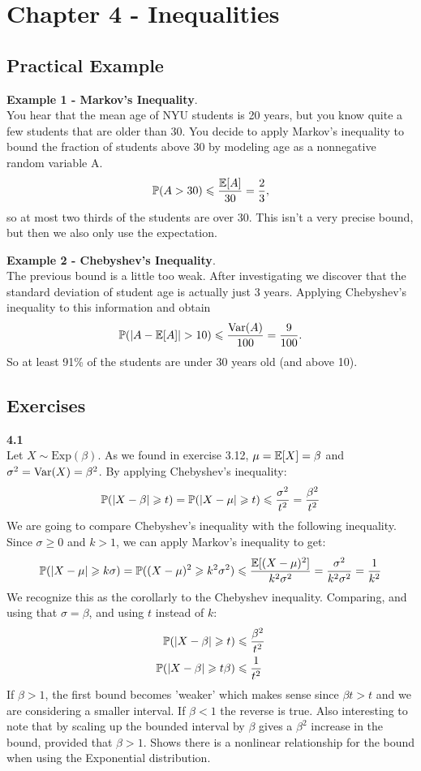 
\newpage
\section{Chapter 4 - Inequalities}

\subsection*{Practical Example}
\textbf{Example 1 - Markov's Inequality}.\\
You hear that the mean age of NYU students is 20 years, but you know quite a few
students that are older than 30. You decide to apply Markov's inequality to bound
the fraction of students above 30 by modeling age as a nonnegative random variable A.
$$
\P(A > 30) \leq \frac{\E[A]}{30} = \frac{2}{3},
$$
so at most two thirds of the students are over 30.
This isn't a very precise bound, but then we also only use the expectation.

\medskip\noindent
\textbf{Example 2 - Chebyshev's Inequality}.\\
The previous bound is a little too weak. After investigating we discover that the
standard deviation of student age is actually just 3 years. Applying Chebyshev's
inequality to this information and obtain
$$
\P(|A - \E[A]| > 10) \leq \frac{\V(A)}{100} = \frac{9}{100}.
$$
So at least 91\% of the students are under 30 years old (and above 10).

\subsection*{Exercises}
\textbf{4.1}\\  %
Let $X\sim\text{Exp}(\beta)$. As we found in exercise 3.12, $\mu = \E[X] = \beta$ and
$\sigma^2 = \V(X) = \beta^2$. By applying Chebyshev's inequality:
$$
\P(|X-\beta|\geq t) = \P(|X-\mu|\geq t) \leq \frac{\sigma^2}{t^2} = \frac{\beta^2}{t^2}
$$
We are going to compare Chebyshev's inequality with the following inequality. Since $\sigma\geq 0$
and $k > 1$, we can apply Markov's inequality to get:
$$
\P(|X-\mu|\geq k\sigma) = \P((X-\mu)^2\geq k^2\sigma^2) \leq
\frac{\E[(X-\mu)^2]}{k^2\sigma^2} = \frac{\sigma^2}{k^2\sigma^2} = \frac{1}{k^2}
$$
We recognize this as the corollarly to the Chebyshev inequality. Comparing,
and using that $\sigma = \beta$, and using $t$ instead of $k$:
\begin{align*}
    \P(|X-\beta|\geq t) &\leq \frac{\beta^2}{t^2} \\
    \P(|X-\beta|\geq t\beta) &\leq \frac{1}{t^2}
\end{align*}
If $\beta > 1$, the first bound becomes 'weaker' which makes sense since $\beta t > t$ and
we are considering a smaller interval. If $\beta < 1$ the reverse is true. Also interesting
to note that by scaling up the bounded interval by $\beta$ gives a $\beta^2$ increase in the
bound, provided that $\beta > 1$. Shows there is a nonlinear relationship for the bound
when using the Exponential distribution.

